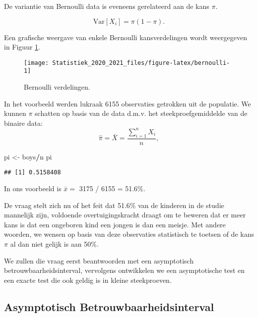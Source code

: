 \documentclass[
  12pt,dutch,coursenotes]{book}
\newenvironment{Shaded}{\begin{snugshade}}{\end{snugshade}}
\newcommand{\NormalTok}[1]{#1}
\newcommand{\OperatorTok}[1]{\textcolor[rgb]{0.81,0.36,0.00}{\textbf{#1}}}
\newcommand{\StringTok}[1]{\textcolor[rgb]{0.31,0.60,0.02}{#1}}
\theoremstyle{definition}
\theoremstyle{definition}
\theoremstyle{definition}
\theoremstyle{remark}
\begin{document}
De variantie van Bernoulli data is eveneens gerelateerd aan de kans \(\pi\).

\[\text{Var}[X_i]=\pi (1-\pi).\]

Een grafische weergave van enkele Bernoulli kansverdelingen wordt weergegeven in Figuur \ref{fig:bernoulli}.

\begin{figure}

{\centering \texttt{[image: Statistiek\_2020\_2021\_files/figure-latex/bernoulli-1]} 

}

\caption{Bernoulli verdelingen.}\label{fig:bernoulli}
\end{figure}

In het voorbeeld werden lukraak
6155 observaties getrokken uit de populatie.
We kunnen \(\pi\) schatten op basis van de data d.m.v. het steekproefgemiddelde van de binaire data:
\[\hat \pi = \bar X = \frac{\sum\limits_{i=1}^n X_i}{n},\]

\begin{Shaded}
\begin{Highlighting}[]
\NormalTok{pi \textless{}{-}}\StringTok{ }\NormalTok{boys}\OperatorTok{/}\NormalTok{n}
\NormalTok{pi}
\end{Highlighting}
\end{Shaded}

\begin{verbatim}
## [1] 0.5158408
\end{verbatim}

In ons voorbeeld is \(\bar x =\) 3175 / 6155 = 51.6\%.

De vraag stelt zich nu of het feit dat 51.6\% van de kinderen in de studie mannelijk zijn, voldoende overtuigingskracht draagt om te beweren dat er meer kans is dat een ongeboren kind een jongen is dan een meisje. Met andere woorden, we wensen op basis van deze observaties statistisch te toetsen of de kans \(\pi\) al dan niet gelijk is aan 50\%.

We zullen die vraag eerst beantwoorden met een asymptotisch betrouwbaarheidsinterval, vervolgens ontwikkelen we een asymptotische test en een exacte test die ook geldig is in kleine steekproeven.

\hypertarget{asymptotisch-betrouwbaarheidsinterval}{%
\subsection{Asymptotisch Betrouwbaarheidsinterval}\label{asymptotisch-betrouwbaarheidsinterval}}
\end{document}

